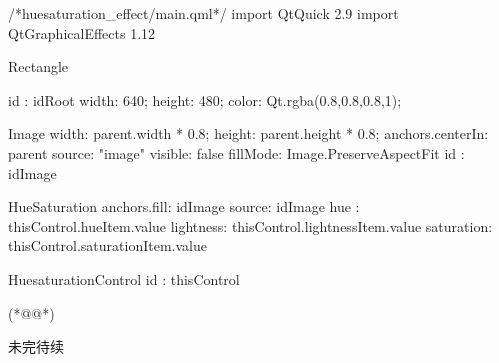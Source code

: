 \label{f000058}    %
\FloatBarrier                                  %
\begin{thebookfilesourceone}[escapeinside={(*@}{@*)},
caption=GoodLuck,
title=\filesourcenumbernameone \thefilesourcenumber
]
/*huesaturation_effect/main.qml*/
import QtQuick 2.9
import QtGraphicalEffects 1.12

Rectangle {
    id : idRoot
    width: 640;
    height: 480;
    color: Qt.rgba(0.8,0.8,0.8,1);

    Image{
        width: parent.width * 0.8;
        height: parent.height * 0.8;
        anchors.centerIn: parent
        source: "image"
        visible: false
        fillMode: Image.PreserveAspectFit
        id : idImage
    }

    HueSaturation{
        anchors.fill: idImage
        source: idImage
        hue : thisControl.hueItem.value
        lightness: thisControl.lightnessItem.value
        saturation: thisControl.saturationItem.value
    }

    HuesaturationControl{
        id : thisControl
    }

}(*@\marginpar[\hfill\setlength\fboxsep{2pt}\fbox{\footnotesize{\kaishu\parbox{1em}{\setlength{\baselineskip}{2pt}\filesourcenumbernameone}}\footnotesize{\thefilesourcenumber}}]{\setlength\fboxsep{2pt}\fbox{\footnotesize{\kaishu\parbox{1em}{\setlength{\baselineskip}{2pt}\filesourcenumbernameone}}\footnotesize{\thefilesourcenumber}}}@*)\end{thebookfilesourceone}          %
\addtocounter{lstlisting}{-1}   %


未完待续









